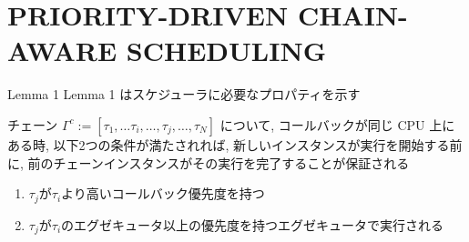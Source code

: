 
\section{PRIORITY-DRIVEN CHAIN-AWARE SCHEDULING}
\label{sec: priority-driven chain-aware scheduling}



\begin{frame}[label=lemma1]{Lemma 1}
    Lemma 1 はスケジューラに必要なプロパティを示す
    \begin{lemma}[]
        チェーン $\Gamma^{c}:=\left[\tau_{1}, \ldots \tau_{i}, \ldots, \tau_{j}, \ldots, \tau_{N}\right]$ について, コールバックが同じ CPU 上にある時, 以下2つの条件が満たされれば, 新しいインスタンスが実行を開始する前に, 前のチェーンインスタンスがその実行を完了することが保証される
        \begin{enumerate}
            \item $\tau_{j}$が$\tau_{i}$より高いコールバック優先度を持つ
            \item $\tau_{j}$が$\tau_{i}$のエグゼキュータ以上の優先度を持つエグゼキュータで実行される
        \end{enumerate}
    \end{lemma}
\end{frame}

